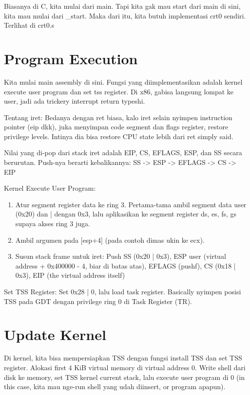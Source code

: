 Biasanya di C, kita mulai dari main. Tapi kita gak mau start dari main di sini, kita mau mulai dari \_start. Maka dari itu, kita butuh implementasi crt0 sendiri. Terlihat di crt0.s

\section{Program Execution}

Kita mulai main assembly di sini. Fungsi yang diimplementasikan adalah kernel execute user program dan set tss register. Di x86, gabisa langsung lompat ke user, jadi ada trickery interrupt return typeshi.

Tentang iret: Bedanya dengan ret biasa, kalo iret selain nyimpen instruction pointer (eip dkk), juka menyimpan code segment dan flags register, restore privilege levels. Intinya dia bisa restore CPU state lebih dari ret simply said.

Nilai yang di-pop dari stack iret adalah EIP, CS, EFLAGS, ESP, dan SS secara berurutan. Push-nya berarti kebalikannya: SS -> ESP -> EFLAGS -> CS -> EIP

Kernel Execute User Program:
\begin{enumerate}
    \item Atur segment register data ke ring 3. Pertama-tama ambil segment data user (0x20) dan | dengan 0x3, lalu aplikasikan ke segment register ds, es, fs, gs supaya akses ring 3 juga.
    \item Ambil argumen pada [esp+4] (pada contoh dimas ukin ke ecx).
    \item Susun stack frame untuk iret: Push SS (0x20 | 0x3), ESP user (virtual address + 0x400000 - 4, biar di batas atas), EFLAGS (pushf), CS (0x18 | 0x3), EIP (the virtual address itself)
\end{enumerate}

Set TSS Register:
Set 0x28 | 0, lalu load task register. Basically nyimpen posisi TSS pada GDT dengan privilege ring 0 di Task Register (TR).

\section{Update Kernel}

Di kernel, kita bisa mempersiapkan TSS dengan fungsi install TSS dan set TSS register. Alokasi first 4 KiB virtual memory di virtual address 0. Write shell dari disk ke memory, set TSS kernel current stack, lalu execute user program di 0 (in this case, kita mau nge-run shell yang udah diinsert, or program apapun).

